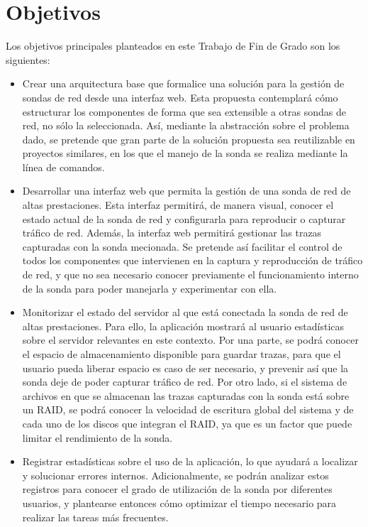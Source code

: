 \section{Objetivos}

Los objetivos principales planteados en este Trabajo de Fin de Grado son los siguientes:

\begin{itemize}
  \item Crear una arquitectura base que formalice una solución para la gestión de sondas de red desde una interfaz web.
  Esta propuesta contemplará cómo estructurar los componentes de forma que sea extensible a otras sondas de red, no sólo la seleccionada.
  Así, mediante la abstracción sobre el problema dado, se pretende que gran parte de la solución propuesta sea reutilizable en proyectos similares, en los que el manejo de la sonda se realiza mediante la línea de comandos.

  \item Desarrollar una interfaz web que permita la gestión de una sonda de red de altas prestaciones.
  Esta interfaz permitirá, de manera visual, conocer el estado actual de la sonda de red y configurarla para reproducir o capturar tráfico de red.
  Además, la interfaz web permitirá gestionar las \glspl{traza} capturadas con la sonda mecionada.
  Se pretende así facilitar el control de todos los componentes que intervienen en la captura y reproducción de tráfico de red, y que no sea necesario conocer previamente el funcionamiento interno de la sonda para poder manejarla y experimentar con ella.

  \item Monitorizar el estado del servidor al que está conectada la sonda de red de altas prestaciones.
  Para ello, la aplicación mostrará al usuario estadísticas sobre el servidor relevantes en este contexto.
  Por una parte, se podrá conocer el espacio de almacenamiento disponible para guardar \glspl{traza}, para que el usuario pueda liberar espacio es caso de ser necesario, y prevenir así que la sonda deje de poder capturar tráfico de red.
  Por otro lado, si el sistema de archivos en que se almacenan las \glspl{traza} capturadas con la sonda está sobre un \gls{RAID}, se podrá conocer la velocidad de escritura global del sistema y de cada uno de los discos que integran el \gls{RAID}, ya que es un factor que puede limitar el rendimiento de la sonda.

  \item Registrar estadísticas sobre el uso de la aplicación, lo que ayudará a localizar y solucionar errores internos.
  Adicionalmente, se podrán analizar estos registros para conocer el grado de utilización de la sonda por diferentes usuarios, y plantearse entonces cómo optimizar el tiempo necesario para realizar las tareas más frecuentes.
\end{itemize}

